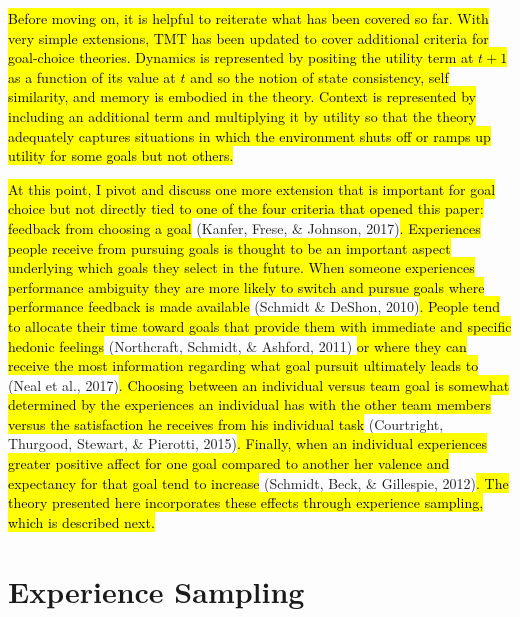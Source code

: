 \documentclass[english,,man]{apa6}
\theoremstyle{definition}
\theoremstyle{definition}
\theoremstyle{definition}
\theoremstyle{remark}
\begin{document}
\hl{Before moving on, it is helpful to reiterate what has been covered so far. With very simple extensions, TMT has been updated to cover additional criteria for goal-choice theories. Dynamics is represented by positing the utility term at $t + 1$ as a function of its value at $t$ and so the notion of state consistency, self similarity, and memory is embodied in the theory. Context is represented by including an additional term and multiplying it by utility so that the theory adequately captures situations in which the environment shuts off or ramps up utility for some goals but not others.}

\hl{At this point, I pivot and discuss one more extension that is important for goal choice but not directly tied to one of the four criteria that opened this paper: feedback from choosing a goal }(Kanfer,
Frese, \& Johnson,
2017)\hl{. Experiences people receive from pursuing goals is thought to be an important aspect underlying which goals they select in the future. When someone experiences performance ambiguity they are more likely to switch and pursue goals where performance feedback is made available }(Schmidt
\& DeShon,
2010)\hl{. People tend to allocate their time toward goals that provide them with immediate and specific hedonic feelings }(Northcraft,
Schmidt, \& Ashford,
2011)\hl{ or where they can receive the most information regarding what goal pursuit ultimately leads to }(Neal
et al.,
2017)\hl{. Choosing between an individual versus team goal is somewhat determined by the experiences an individual has with the other team members versus the satisfaction he receives from his individual task}
(Courtright, Thurgood, Stewart, \& Pierotti,
2015)\hl{. Finally, when an individual experiences greater positive affect for one goal compared to another her valence and expectancy for that goal tend to increase}
(Schmidt, Beck, \& Gillespie,
2012)\hl{. The theory presented here incorporates these effects through experience sampling, which is described next.}

\hypertarget{experience-sampling}{%
\section{Experience Sampling}\label{experience-sampling}}
\end{document}
